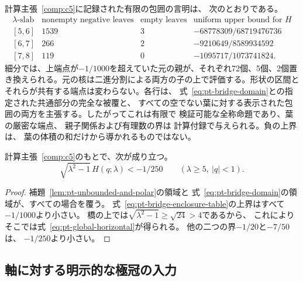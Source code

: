 計算主張~\ref{comp:c5}に記録された有限の包囲の言明は、
次のとおりである。
\begin{equation}
\begin{array}{c|r|r|c}
 \lambda\text{-slab}&
 \text{nonempty negative leaves}&
 \text{empty leaves}&
 \text{uniform upper bound for }H\\ \hline
 {[5,6]}&1539&3&-68778309/68719476736\\
 {[6,7]}&266&2&-9210649/8589934592\\
 {[7,8]}&119&0&-1095717/1073741824 .
\end{array}
\label{eq:pt-bridge-enclosure-table}
\end{equation}
細分では、上端点が$-1/1000$を超えていた元の親が、それぞれ72個、5個、2個置き換えられる。元の核は二進分割による両方の子の上で評価する。形状の区間とそれらが共有する端点は変わらない。各行は、
式~\eqref{eq:pt-bridge-domain}との指定された共通部分の完全な被覆と、
すべての空でない葉に対する表示された包囲の両方を主張する。したがってこれは有限で
検証可能な全称命題であり、葉の厳密な端点、
親子関係および有理数の界は
計算付録で与えられる。負の上界は、
葉の体積の和だけから導かれるものではない。

\begin{proposition}[一様な横断方向の負値性]
\label{prop:pt-horizontal-negative}
計算主張~\ref{comp:c5}のもとで、次が成り立つ。
\begin{equation}
 \sqrt{\lambda^2-1}\,H(q;\lambda)<-1/250
 \qquad(\lambda\geq5,\ |q|<1).
\label{eq:pt-global-horizontal}
\end{equation}
\end{proposition}

\begin{proof}
補題~\ref{lem:pt-unbounded-and-polar}の領域と
式~\eqref{eq:pt-bridge-domain}の領域が、すべての場合を覆う。
式~\eqref{eq:pt-bridge-enclosure-table}の上界はすべて
$-1/1000$より小さい。
橋の上では$\sqrt{\lambda^2-1}\geq\sqrt{24}>4$であるから、
これによりそこでは式~\eqref{eq:pt-global-horizontal}が得られる。
他の二つの界$-1/20$と$-7/50$は、
$-1/250$より小さい。
\end{proof}

\subsection{軸に対する明示的な極冠の入力}
\label{subsec:pt-polar-cap}

